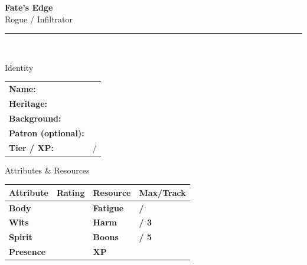 \documentclass[10pt]{article}
\begin{document}
\begin{center}
    {\Huge\bfseries\sffamily\color{edgered} Fate's Edge}\\[0.2em]
    {\large\sffamily Rogue / Infiltrator}\\[0.5em]
    \rule{0.5\textwidth}{0.5pt}\\[1em]
\end{center}

\begin{minipage}[t]{0.48\linewidth}
    \begin{charbox}{Identity}
        \begin{tabular}{p{2.5cm} p{5cm}}
            \textbf{Name:} & \underline{\hspace{4cm}} \\
            \textbf{Heritage:} & \underline{\hspace{4cm}} \\
            \textbf{Background:} & \underline{\hspace{4cm}} \\
            \textbf{Patron (optional):} & \underline{\hspace{4cm}} \\
            \textbf{Tier / XP:} & \underline{\hspace{2cm}} / \underline{\hspace{2cm}} \\
        \end{tabular}
    \end{charbox}
    
    \vspace{0.5em}
    
    \begin{charbox}{Attributes \& Resources}
        \begin{tabular}{>{\bfseries}p{2.5cm} >{\bfseries}p{1.5cm} >{\bfseries}p{2.5cm} >{\bfseries}p{1.5cm}}
            \toprule
            \textbf{Attribute} & \textbf{Rating} & \textbf{Resource} & \textbf{Max/Track} \\
            \midrule
            Body & \underline{\hspace{1.5cm}} & Fatigue & \underline{\hspace{1.5cm}} / \underline{\hspace{1.5cm}} \\
            Wits & \underline{\hspace{1.5cm}} & Harm & \underline{\hspace{1.5cm}} / 3 \\
            Spirit & \underline{\hspace{1.5cm}} & Boons & \underline{\hspace{1.5cm}} / 5 \\
            Presence & \underline{\hspace{1.5cm}} & XP & \underline{\hspace{1.5cm}} \\
            \bottomrule
        \end{tabular}
    \end{charbox}
    

\end{minipage}
\end{document}

